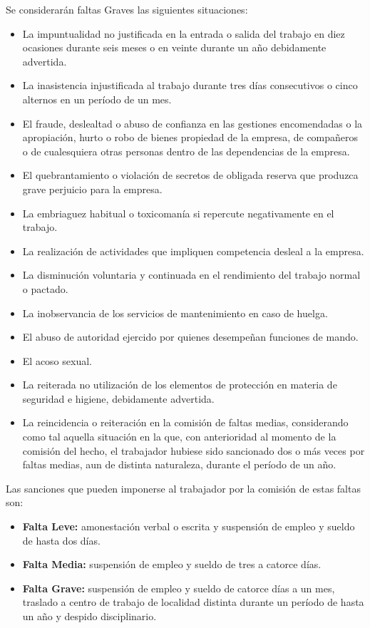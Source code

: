 \documentclass[11pt,bibtotoc,noliststotoc,BCOR0mm]{scrbook}
\begin{document}
Se considerarán faltas Graves las siguientes situaciones:
\begin{itemize}
\item La impuntualidad no justificada en la entrada o salida del trabajo en diez ocasiones durante seis meses o en veinte durante un año debidamente advertida.
\item La inasistencia injustificada al trabajo durante tres días consecutivos o cinco alternos en un período de un mes.
\item El fraude, deslealtad o abuso de confianza en las gestiones encomendadas o la apropiación, hurto o robo de bienes propiedad de la empresa, de compañeros o de cualesquiera otras personas dentro de las dependencias de la empresa.
\item El quebrantamiento o violación de secretos de obligada reserva que produzca grave perjuicio para la empresa.
\item La embriaguez habitual o toxicomanía si repercute negativamente en el trabajo.
\item La realización de actividades que impliquen competencia desleal a la empresa.
\item La disminución voluntaria y continuada en el rendimiento del trabajo normal o pactado.
\item La inobservancia de los servicios de mantenimiento en caso de huelga.
\item El abuso de autoridad ejercido por quienes desempeñan funciones de mando.
\item El acoso sexual.
\item La reiterada no utilización de los elementos de protección en materia de seguridad e higiene, debidamente advertida.
\item La reincidencia o reiteración en la comisión de faltas medias, considerando como tal aquella situación en la que, con anterioridad al momento de la comisión del hecho, el trabajador hubiese sido sancionado dos o más veces por faltas medias, aun de distinta naturaleza, durante el período de un año.
\end{itemize}

Las sanciones que pueden imponerse al trabajador por la comisión de estas faltas son:
\begin{itemize}
\item \textbf{Falta Leve:} amonestación verbal o escrita y suspensión de empleo y sueldo de hasta dos días.
\item \textbf{Falta Media:} suspensión de empleo y sueldo de tres a catorce días.
\item \textbf{Falta Grave:} suspensión de empleo y sueldo de catorce días a un mes, traslado a centro de trabajo de localidad distinta durante un período de hasta un año y despido disciplinario.
\end{itemize}
\end{document}
